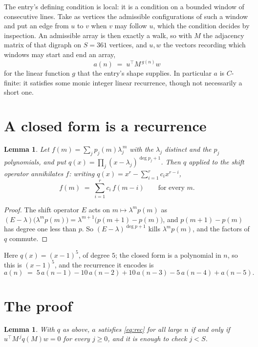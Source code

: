 \documentclass[11pt,a4paper]{article}
\theoremstyle{plain}
\newtheorem{lemma}[theorem]{Lemma}
\theoremstyle{definition}
\begin{document}
The entry's defining condition is local: it is a condition on a bounded window of consecutive lines. Take as vertices the
admissible configurations of such a window and put an edge from $u$ to $v$ when $v$ may
follow $u$, which the condition decides by inspection. An admissible array is then exactly a
walk, so with $M$ the adjacency matrix of that digraph on $S=361$ vertices, and $u,w$ the
vectors recording which windows may start and end an array,
\[
a(n)\;=\;u^{\!\top}M^{\,g(n)}w
\]
for the linear function $g$ that the entry's shape supplies. In particular $a$ is
$C$-finite: it satisfies some monic integer linear recurrence, though not necessarily a short
one.

\section{A closed form is a recurrence}

\begin{lemma}\label{lem:ann}
Let $f(m)=\sum_{j}p_j(m)\lambda_j^{\,m}$ with the $\lambda_j$ distinct and the $p_j$
polynomials, and put $q(x)=\prod_j(x-\lambda_j)^{\deg p_j+1}$. Then $q$ applied to the shift
operator annihilates $f$: writing $q(x)=x^{r}-\sum_{i=1}^{r}c_ix^{r-i}$,
\[
f(m)\;=\;\sum_{i=1}^{r}c_i\,f(m-i)\qquad\text{for every }m.
\]
\end{lemma}

\begin{proof}
The shift operator $E$ acts on $m\mapsto\lambda^{m}p(m)$ as
$(E-\lambda)\bigl(\lambda^{m}p(m)\bigr)=\lambda^{m+1}\bigl(p(m+1)-p(m)\bigr)$, and
$p(m+1)-p(m)$ has degree one less than $p$. So $(E-\lambda)^{\deg p+1}$ kills
$\lambda^{m}p(m)$, and the factors of $q$ commute.
\end{proof}

Here $q(x)=(x-1)^{5}$, of degree $5$; the closed form is a polynomial in $n$, so this is $(x-1)^{5}$, and the recurrence it encodes is
\begin{equation}\label{eq:rec}
a(n)\;=\;5\,a(n-1) - 10\,a(n-2) + 10\,a(n-3) - 5\,a(n-4) + a(n-5).
\end{equation}

\section{The proof}

\begin{lemma}\label{lem:crit}
With $q$ as above, $a$ satisfies \eqref{eq:rec} for all large $n$ if and only if
$u^{\!\top}M^{\,j}q(M)w=0$ for every $j\ge0$, and it is enough to check $j<S$.
\end{lemma}
\end{document}
